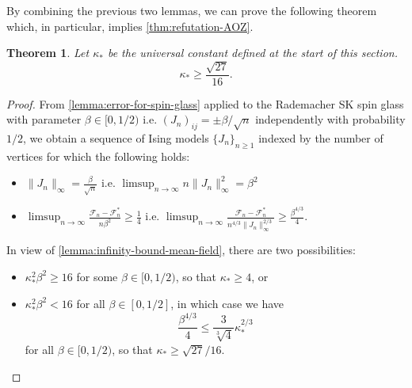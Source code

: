 \documentclass[11pt, oneside, english]{article}
\newcommand{\F}{\mathcal{F}}
\newtheorem{theorem}{Theorem}[section]
\theoremstyle{definition}
\theoremstyle{plain}
\begin{document}
By combining the previous two lemmas, we can prove the following theorem which, in particular, implies \cref{thm:refutation-AOZ}. 
\begin{theorem} Let $\kappa_*$ be the universal constant defined at the start of this section. 
\[ \kappa_* \ge \frac{\sqrt{27}}{16}. \]
\end{theorem}
\begin{proof}
From \cref{lemma:error-for-spin-glass} applied to the Rademacher SK spin glass with parameter $\beta \in [0,1/2)$ i.e. $(J_n)_{ij} = \pm \beta/\sqrt{n}$ independently with probability $1/2$, we obtain a sequence of Ising models $\{J_n\}_{n\geq 1}$ indexed by the number of vertices for which the following holds:
\begin{itemize}
\item $\|J_n\|_{\infty} = \frac{\beta}{\sqrt{n}}$ i.e. $\limsup_{n \to \infty}n\|J_n\|_{\infty}^{2} = \beta^{2}$ 
\item $\limsup_{n\to \infty}\frac{\F_n - \F_n^*}{n\beta^{2}}\geq \frac{1}{4}$ i.e. $\limsup_{n\to \infty}\frac{\F_n - \F_n^*}{n^{4/3}\|J_n\|_{\infty}^{2/3}}\geq \frac{\beta^{4/3}}{4}$. 
\end{itemize}
In view of \cref{lemma:infinity-bound-mean-field}, there are two possibilities: 
\begin{itemize}
\item $\kappa_*^{2} \beta^{2} \geq 16$ for some $\beta \in [0,1/2)$, so that $\kappa_* \geq 4$, or
\item $\kappa_*^{2} \beta^{2} < 16$ for all $\beta \in [0,1/2]$, in which case we have
$$\frac{\beta^{4/3}}{4} \leq \frac{3}{\sqrt[3]{4}}\kappa_*^{2/3}$$
for all $\beta \in [0,1/2)$, so that $\kappa_* \geq \sqrt{27}/16$. 
\end{itemize}

\end{proof}
\end{document}
